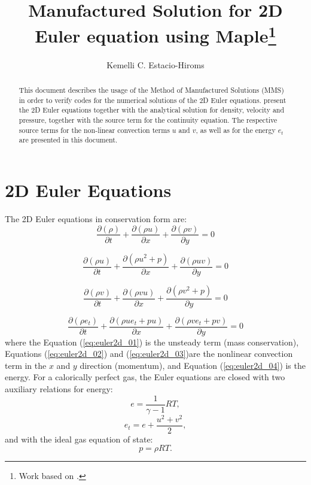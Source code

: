 \documentclass[10pt]{article}
\title{Manufactured Solution for 2D Euler equation using Maple\footnote{Work based on \citet*{Roy2002}.}}
\author{Kemelli C. Estacio-Hiroms}
\newcommand{\Diff}[2] {\dfrac{\partial( #1)}{\partial #2}}
\begin{document}
\maketitle

\begin{abstract}
This document describes the usage of the Method of Manufactured Solutions (MMS) in order to verify codes for the numerical solutions of the 2D Euler equations. \citet{Roy2002}  present the 2D Euler equations together with the analytical solution for density, velocity and pressure, together with the source term for the continuity equation. The respective source terms for the non-linear convection terms $u$ and $v$, as well as for the energy $e_t$ are presented in this document.
\end{abstract}





\section{2D Euler Equations}
The 2D Euler equations in conservation form are:
\begin{equation}
 \label{eq:euler2d_01}
\Diff{\rho}{t} + \Diff{\rho u}{x}+\Diff{\rho v}{y} = 0
\end{equation}


\begin{equation}
 \label{eq:euler2d_02}
\Diff{\rho u}{t} + \Diff{\rho u^2 + p}{x}+\Diff{\rho uv}{y} = 0
\end{equation}


\begin{equation}
 \label{eq:euler2d_03}
\Diff{\rho v}{t} + \Diff{\rho vu}{x}+\Diff{\rho v^2+p}{y} = 0
\end{equation}


\begin{equation}
 \label{eq:euler2d_04}
\Diff{\rho e_t}{t} + \Diff{\rho ue_t +pu}{x}+\Diff{\rho ve_t +pv}{y} = 0
\end{equation}
%
where the Equation (\ref{eq:euler2d_01}) is the unsteady term (mass conservation), Equations (\ref{eq:euler2d_02}) and (\ref{eq:euler2d_03})are the nonlinear convection term in the $x$ and $y$ direction (momentum), and Equation (\ref{eq:euler2d_04}) is the energy. For a calorically perfect gas, the Euler equations are closed with two auxiliary relations for energy:
\begin{equation}
 \label{eq:euler2d_05}
e=\dfrac{1}{\gamma -1}RT ,
\end{equation}
%
\begin{equation}
 \label{eq:euler2d_06}
e_t= e+\dfrac{u^2+v^2}{2},
\end{equation}
and with the ideal gas equation of state:
\begin{equation}
 \label{eq:euler2d_07}
p=\rho RT.
\end{equation}
\end{document}
